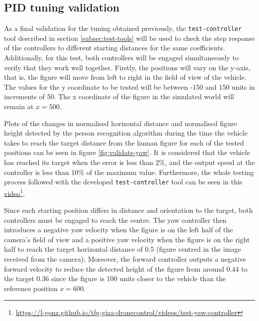 \subsection{PID tuning validation}
\label{subsec:pid-test-controller}

As a final validation for the tuning obtained previously, the \texttt{test-controller} tool described in section \ref{subsec:test-tools} will be used to check the step response of the controllers to different starting distances for the same coefficients.
Additionally, for this test, both controllers will be engaged simultaneously to verify that they work well together.
Firstly, the positions will vary on the y-axis, that is, the figure will move from left to right in the field of view of the vehicle.
The values for the y coordinate to be tested will be between -150 and 150 units in increments of 50.
The x coordinate of the figure in the simulated world will remain at $x=500$.

Plots of the changes in normalised horizontal distance and normalised figure height detected by the person recognition algorithm during the time the vehicle takes to reach the target distance from the human figure for each of the tested positions can be seen in figure \ref{fig:validate-yaw}.
It is considered that the vehicle has reached its target when the error is less than 2\%, and the output speed at the controller is less than 10\% of the maximum value.
Furthermore, the whole testing process followed with the developed \texttt{test-controller} tool can be seen in this \href{https://l-gonz.github.io/tfg-giaa-dronecontrol/videos/test-yaw-controller}{video}\footnote{\url{https://l-gonz.github.io/tfg-giaa-dronecontrol/videos/test-yaw-controller}}.

Since each starting position differs in distance and orientation to the target, both controllers must be engaged to reach the centre.
The yaw controller then introduces a negative yaw velocity when the figure is on the left half of the camera's field of view and a positive yaw velocity when the figure is on the right half to reach the target horizontal distance of 0.5 (figure centred in the image received from the camera);
Moreover, the forward controller outputs a negative forward velocity to reduce the detected height of the figure from around 0.44 to the target 0.36 since the figure is 100 units closer to the vehicle than the reference position $x=600$.

